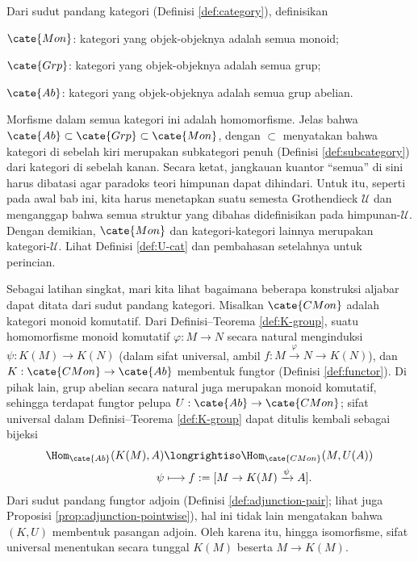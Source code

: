 \begin{remark}\label{rem:grp-cat}
	Dari sudut pandang kategori (Definisi \ref{def:category}), definisikan
	\begin{compactitem}
		\item $\cate{Mon}$: kategori yang objek-objeknya adalah semua monoid;
		\item $\cate{Grp}$: kategori yang objek-objeknya adalah semua grup;
		\item $\cate{Ab}$: kategori yang objek-objeknya adalah semua grup abelian.
	\end{compactitem}
	Morfisme dalam semua kategori ini adalah homomorfisme. Jelas bahwa $\cate{Ab} \subset \cate{Grp} \subset \cate{Mon}$, dengan $\subset$ menyatakan bahwa kategori di sebelah kiri merupakan subkategori penuh (Definisi \ref{def:subcategory}) dari kategori di sebelah kanan. Secara ketat, jangkauan kuantor ``semua'' di sini harus dibatasi agar paradoks teori himpunan dapat dihindari. Untuk itu, seperti pada awal bab ini, kita harus menetapkan suatu semesta Grothendieck $\mathcal{U}$ dan menganggap bahwa semua struktur yang dibahas didefinisikan pada himpunan-$\mathcal{U}$. Dengan demikian, $\cate{Mon}$ dan kategori-kategori lainnya merupakan kategori-$\mathcal{U}$. Lihat Definisi \ref{def:U-cat} dan pembahasan setelahnya untuk perincian.
\end{remark}

Sebagai latihan singkat, mari kita lihat bagaimana beberapa konstruksi aljabar dapat ditata dari sudut pandang kategori. Misalkan $\cate{CMon}$ adalah kategori monoid komutatif. Dari Definisi--Teorema \ref{def:K-group}, suatu homomorfisme monoid komutatif $\varphi: M \to N$ secara natural menginduksi $\psi: K(M) \to K(N)$ (dalam sifat universal, ambil $f: M \xrightarrow{\varphi} N \to K(N)$), dan $K: \cate{CMon} \to \cate{Ab}$ membentuk fungtor (Definisi \ref{def:functor}). Di pihak lain, grup abelian secara natural juga merupakan monoid komutatif, sehingga terdapat fungtor pelupa $U: \cate{Ab} \to \cate{CMon}$; sifat universal dalam Definisi--Teorema \ref{def:K-group} dapat ditulis kembali sebagai bijeksi
\begin{align*}
	\Hom_{\cate{Ab}}(K(M), A) & \longrightiso \Hom_{\cate{CMon}}(M, U(A)) \\
	\psi & \longmapsto f := [M \to K(M) \xrightarrow{\psi} A].
\end{align*}
Dari sudut pandang fungtor adjoin (Definisi \ref{def:adjunction-pair}; lihat juga Proposisi \ref{prop:adjunction-pointwise}), hal ini tidak lain mengatakan bahwa $(K, U)$ membentuk pasangan adjoin. Oleh karena itu, hingga isomorfisme, sifat universal menentukan secara tunggal $K(M)$ beserta $M \to K(M)$.
